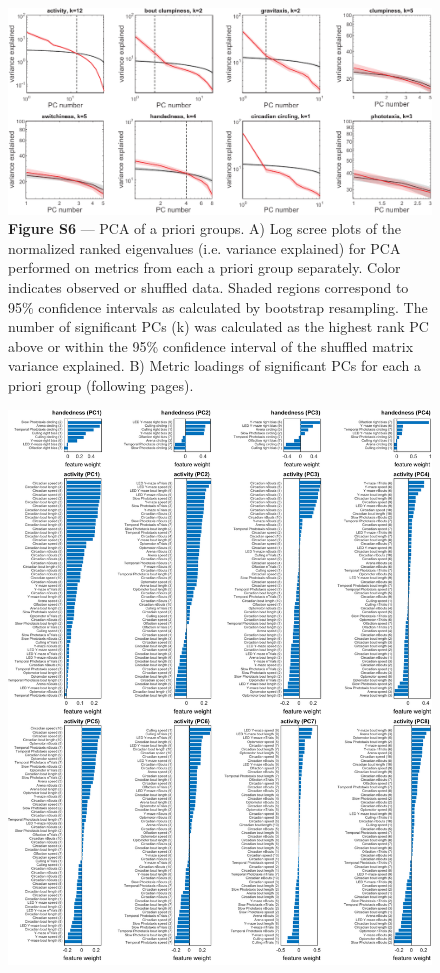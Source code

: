 \documentclass[12pt,letterpaper]{article}
\begin{document}
\begin{figure}[t!]
    \includegraphics[width=\textwidth]{../figures/chapter_3/fig_s6-1.pdf}
    \vspace{.05in}
    \caption*{\textbf{Figure S6} — PCA of a priori groups. A) Log scree plots of the normalized ranked eigenvalues (i.e. variance explained) for PCA performed on metrics from each a priori group separately. Color indicates observed or shuffled data. Shaded regions correspond to 95\% confidence intervals as calculated by bootstrap resampling. The number of significant PCs (k) was calculated as the highest rank PC above or within the 95\% confidence interval of the shuffled matrix variance explained. B) Metric loadings of significant PCs for each a priori group (following pages).}
\end{figure}
\clearpage
\begin{figure}[t!]
    \includegraphics[width=\textwidth]{../figures/chapter_3/fig_s6-2.pdf}
\end{figure}
\end{document}
